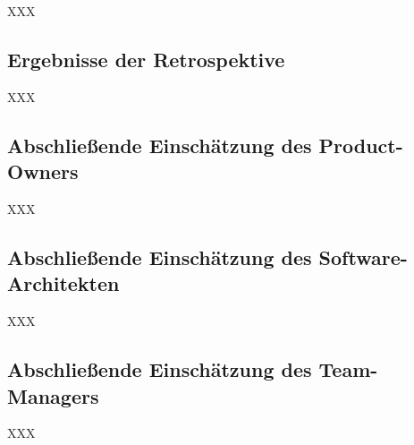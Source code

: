 XXX

\subsection{Ergebnisse der Retrospektive}

XXX

\subsection{Abschließende Einschätzung des Product-Owners}

XXX

\subsection{Abschließende Einschätzung des Software-Architekten}

XXX

\subsection{Abschließende Einschätzung des Team-Managers}

XXX

